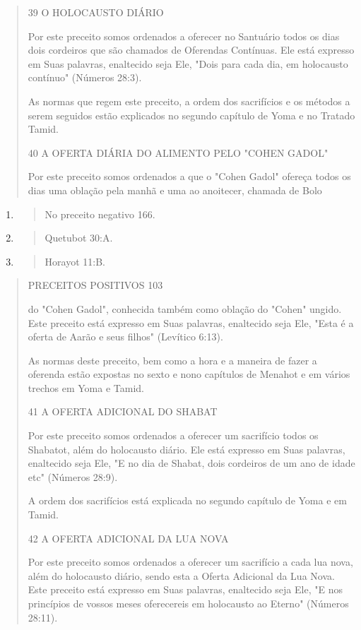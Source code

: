 \begin{quote}
39 O HOLOCAUSTO DIÁRIO

Por este preceito somos ordenados a oferecer no Santuário todos os dias
dois cordeiros que são chamados de Oferendas Contínuas. Ele está
ex­presso em Suas palavras, enaltecido seja Ele, "Dois para cada dia, em
holocaus­to contínuo" (Números 28:3).

As normas que regem este preceito, a ordem dos sacrifícios e os mé­todos
a serem seguidos estão explicados no segundo capítulo de Yoma e no
Tratado Tamid.

40 A OFERTA DIÁRIA DO ALIMENTO PELO "COHEN GADOL"

Por este preceito somos ordenados a que o "Cohen Gadol" ofereça todos os
dias uma oblação pela manhã e uma ao anoitecer, chamada de Bolo
\end{quote}

\begin{enumerate}
\def\labelenumi{\arabic{enumi}.}
\setcounter{enumi}{63}
\item
  \begin{quote}
  No preceito negativo 166.
  \end{quote}
\item
  \begin{quote}
  Quetubot 30:A.
  \end{quote}
\item
  \begin{quote}
  Horayot 11:B.
  \end{quote}
\end{enumerate}

\begin{quote}
PRECEITOS POSITIVOS 103

do "Cohen Gadol", conhecida também como oblação do "Cohen" ungido. Este
preceito está expresso em Suas palavras, enaltecido seja Ele, "Esta é a
oferta de Aarão e seus filhos" (Levítico 6:13).

As normas deste preceito, bem como a hora e a maneira de fazer a
oferenda estão expostas no sexto e nono capítulos de Menahot e em vários
tre­chos em Yoma e Tamid.

41 A OFERTA ADICIONAL DO SHABAT

Por este preceito somos ordenados a oferecer um sacrifício todos os
Shabatot, além do holocausto diário. Ele está expresso em Suas palavras,
enal­tecido seja Ele, "E no dia de Shabat, dois cordeiros de um ano de
idade etc" (Números 28:9).

A ordem dos sacrifícios está explicada no segundo capítulo de Yo­ma e em
Tamid.

42 A OFERTA ADICIONAL DA LUA NOVA

Por este preceito somos ordenados a oferecer um sacrifício a cada lua
nova, além do holocausto diário, sendo esta a Oferta Adicional da Lua
No­va. Este preceito está expresso em Suas palavras, enaltecido seja
Ele, "E nos princípios de vossos meses oferecereis em holocausto ao
Eterno" (Números 28:11).
\end{quote}

